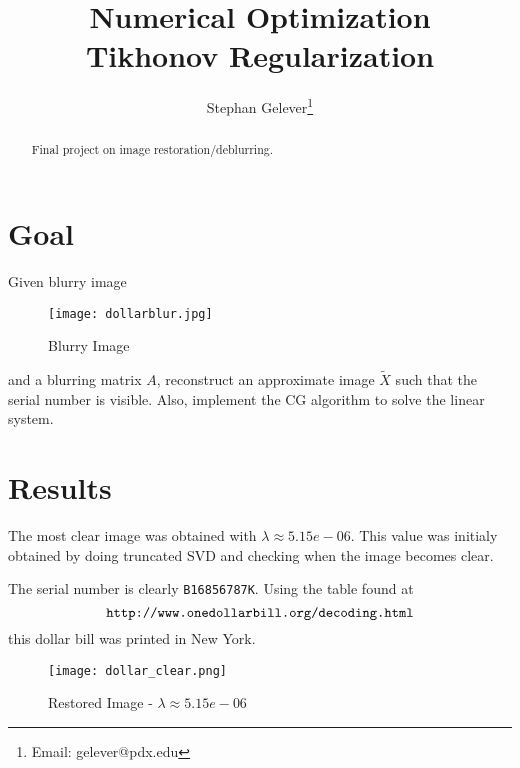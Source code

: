 \documentclass{article}
\title{Numerical Optimization \\ Tikhonov Regularization}
\author{Stephan Gelever\footnote{Email: gelever@pdx.edu}}
\begin{document}
\maketitle
\begin{abstract}
Final project on image restoration/deblurring.
\end{abstract}

\section{Goal}
Given blurry image
\begin{center}
    \begin{figure}[h]
        \centering
                \texttt{[image: dollarblur.jpg]}
                    \caption{Blurry Image}
                        \label{Blurry Image}
    \end{figure}
\end{center}

and a blurring matrix \(A\), reconstruct an approximate image \(\tilde X\) such that the
serial number is visible. Also, implement the CG algorithm to solve the linear system.
\pagebreak

\section{Results}
The most clear image was obtained with \(\lambda\approx5.15e-06\).
This value was initialy obtained by doing truncated SVD and checking when the image becomes clear.

The serial number is clearly \verb|B16856787K|.  Using the table found at
\[\verb|http://www.onedollarbill.org/decoding.html|\] this dollar bill was printed in New York.

\begin{center}
    \begin{figure}[h]
        \centering
                \texttt{[image: dollar\_clear.png]}
                    \caption{Restored Image - \(\lambda\approx5.15e-06\)}
                        \label{Restored Image}
    \end{figure}
\end{center}

\pagebreak
\end{document}
